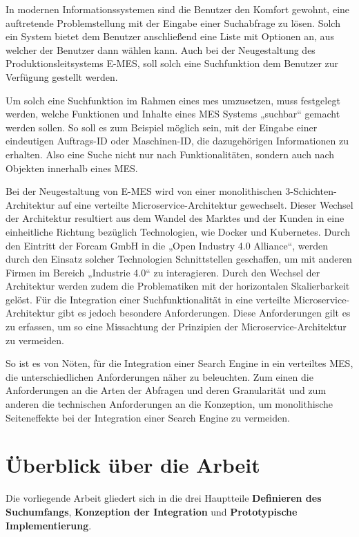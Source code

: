 In modernen Informationssystemen sind die Benutzer den Komfort gewohnt, eine auftretende Problemstellung mit der Eingabe einer Suchabfrage zu lösen. Solch ein System bietet dem Benutzer anschließend eine Liste mit Optionen an, aus welcher der Benutzer dann wählen kann. Auch bei der Neugestaltung des Produktionsleitsystems E-MES, soll solch eine Suchfunktion dem Benutzer zur Verfügung gestellt werden.

Um solch eine Suchfunktion im Rahmen eines \gls{mes} umzusetzen, muss festgelegt werden, welche Funktionen und Inhalte eines MES Systems „suchbar“ gemacht werden sollen. So soll es zum Beispiel möglich sein, mit der Eingabe einer eindeutigen Auftrags-ID oder Maschinen-ID, die dazugehörigen Informationen zu erhalten. Also eine Suche nicht nur nach Funktionalitäten, sondern auch nach Objekten innerhalb eines MES.

Bei der Neugestaltung von E-MES wird von einer monolithischen 3-Schichten-Architektur auf eine verteilte Microservice-Architektur gewechselt. Dieser Wechsel der Architektur resultiert aus dem Wandel des Marktes und der Kunden in eine einheitliche Richtung bezüglich Technologien, wie Docker und Kubernetes. Durch den Eintritt der Forcam GmbH in die „Open Industry 4.0 Alliance“, werden durch den Einsatz solcher Technologien Schnittstellen geschaffen, um mit anderen Firmen im Bereich „Industrie 4.0“ zu interagieren. Durch den Wechsel der Architektur werden zudem die Problematiken mit der horizontalen Skalierbarkeit gelöst. Für die Integration einer Suchfunktionalität in eine verteilte Microservice-Architektur gibt es jedoch besondere Anforderungen. Diese Anforderungen gilt es zu erfassen, um so eine Missachtung der Prinzipien der Microservice-Architektur zu vermeiden.

So ist es von Nöten, für die Integration einer Search Engine in ein verteiltes MES, die unterschiedlichen Anforderungen näher zu beleuchten. Zum einen die Anforderungen an die Arten der Abfragen und deren Granularität und zum anderen die technischen Anforderungen an die Konzeption, um monolithische Seiteneffekte bei der Integration einer Search Engine zu vermeiden.

\section{Überblick über die Arbeit\label{sec1.3:Unterpunkt-3}}

Die vorliegende Arbeit gliedert sich in die drei Hauptteile \glqq \textbf{Definieren des Suchumfangs}\grqq{}, \glqq \textbf{Konzeption der Integration}\grqq{} und \glqq \textbf{Prototypische Implementierung}\grqq{}.

